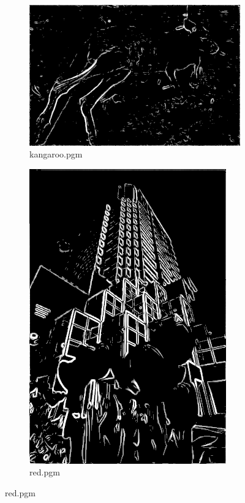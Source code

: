 \documentclass{article}
\begin{document}
\begin{figure}[!h]
  \begin{subfigure}{0.6\textwidth}
    \includegraphics[width=\textwidth]{kangsobel}
    \caption{kangaroo.pgm}
    \label{fig:f1}
  \end{subfigure}
     \hfill
  \begin{subfigure}{0.4\textwidth}
    \includegraphics[width=\textwidth]{redsobel}
    \caption{red.pgm}
    \label{fig:f2}
  \end{subfigure}
  \hfill
  

\end{figure}
\end{document}
